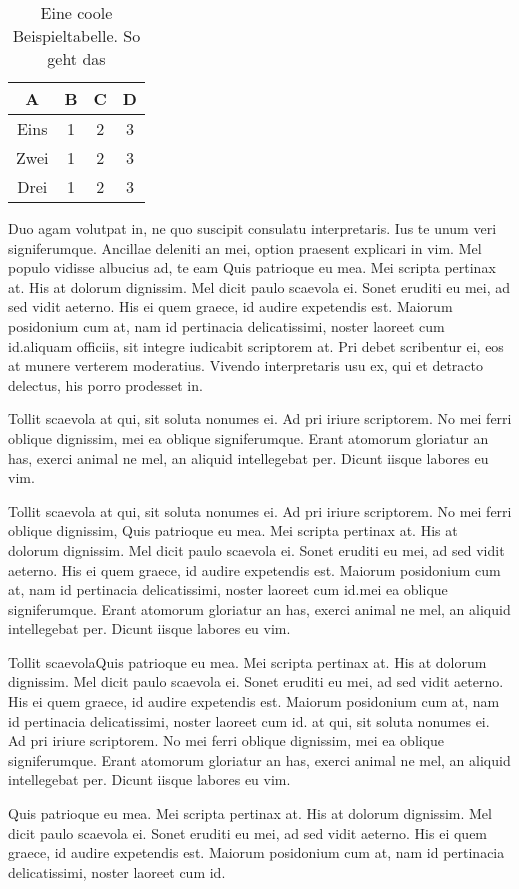 \documentclass[%
 12pt,           %
 english,        %
 a4paper,        %
 DIV14,          %
 twoside,        %
 thesis,         %
 impberklaerung, %
]{hdprotokoll}   %
\begin{document}
\begin{table}
    \centering
    \caption{Eine coole Beispieltabelle. So geht das}
    \label{tab:example}
    \begin{tabular}{cccc} \toprule    
        \textbf{A} & \textbf{B} & \textbf{C} & \textbf{D}\\
        \midrule
        Eins &1 &2 &3 \\
        Zwei &1 &2 &3 \\
        Drei &1 &2 &3 \\
        \bottomrule
    \end{tabular} 
\end{table}

Duo agam volutpat in, ne quo suscipit consulatu interpretaris. Ius te unum veri signiferumque. Ancillae deleniti an mei, option praesent explicari in vim. Mel populo vidisse albucius ad, te eam Quis patrioque eu mea. Mei scripta pertinax at. His at dolorum dignissim. Mel dicit paulo scaevola ei. Sonet eruditi eu mei, ad sed vidit aeterno. His ei quem graece, id audire expetendis est. Maiorum posidonium cum at, nam id pertinacia delicatissimi, noster laoreet cum id.aliquam officiis, sit integre iudicabit scriptorem at. Pri debet scribentur ei, eos at munere verterem moderatius. Vivendo interpretaris usu ex, qui et detracto delectus, his porro prodesset in.

Tollit scaevola at qui, sit soluta nonumes ei. Ad pri iriure scriptorem. No mei ferri oblique dignissim, mei ea oblique signiferumque. Erant atomorum gloriatur an has, exerci animal ne mel, an aliquid intellegebat per. Dicunt iisque labores eu vim.

Tollit scaevola at qui, sit soluta nonumes ei. Ad pri iriure scriptorem. No mei ferri oblique dignissim, Quis patrioque eu mea. Mei scripta pertinax at. His at dolorum dignissim. Mel dicit paulo scaevola ei. Sonet eruditi eu mei, ad sed vidit aeterno. His ei quem graece, id audire expetendis est. Maiorum posidonium cum at, nam id pertinacia delicatissimi, noster laoreet cum id.mei ea oblique signiferumque. Erant atomorum gloriatur an has, exerci animal ne mel, an aliquid intellegebat per. Dicunt iisque labores eu vim.

Tollit scaevolaQuis patrioque eu mea. Mei scripta pertinax at. His at dolorum dignissim. Mel dicit paulo scaevola ei. Sonet eruditi eu mei, ad sed vidit aeterno. His ei quem graece, id audire expetendis est. Maiorum posidonium cum at, nam id pertinacia delicatissimi, noster laoreet cum id. at qui, sit soluta nonumes ei. Ad pri iriure scriptorem. No mei ferri oblique dignissim, mei ea oblique signiferumque. Erant atomorum gloriatur an has, exerci animal ne mel, an aliquid intellegebat per. Dicunt iisque labores eu vim.



Quis patrioque eu mea. Mei scripta pertinax at. His at dolorum dignissim. Mel dicit paulo scaevola ei. Sonet eruditi eu mei, ad sed vidit aeterno. His ei quem graece, id audire expetendis est. Maiorum posidonium cum at, nam id pertinacia delicatissimi, noster laoreet cum id.

\printbibliography                %
\end{document}
